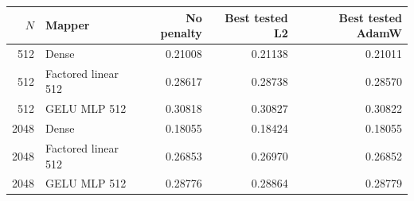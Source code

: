 \begin{tabular}{rlrrr}
\toprule
$N$ & Mapper & No penalty & Best tested L2 & Best tested AdamW \\
\midrule
512 & Dense & 0.21008 & 0.21138 & 0.21011 \\
512 & Factored linear 512 & 0.28617 & 0.28738 & 0.28570 \\
512 & GELU MLP 512 & 0.30818 & 0.30827 & 0.30822 \\
\midrule
2048 & Dense & 0.18055 & 0.18424 & 0.18055 \\
2048 & Factored linear 512 & 0.26853 & 0.26970 & 0.26852 \\
2048 & GELU MLP 512 & 0.28776 & 0.28864 & 0.28779 \\
\bottomrule
\end{tabular}
